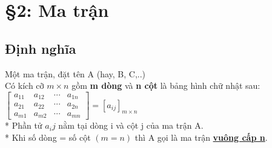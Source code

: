 \section{\S 2: Ma trận}
\subsection{Định nghĩa}
Một ma trận, đặt tên A (hay, B, C,..) \\
Có kích cỡ \textbf{$m\times n$} gồm \textbf{m dòng} và \textbf{n cột} là bảng hình chữ nhật sau:
$
\begin{bmatrix}
	a_{11} & a_{12} & \cdots & a_{1n} \\
	a_{21} & a_{22} & \cdots & a_{2n} \\
	a_{m1} & a_{m2} & \cdots & a_{mn}
\end{bmatrix} =[a_{ij}]_{m\times n}
$ \\
* Phần tử $a_ij$ nằm tại dòng i và cột j của ma trận A. \\
* Khi số dòng = số cột $(m=n)$ thì A gọi là ma trận \textbf{\underline{vuông cấp n}}.

